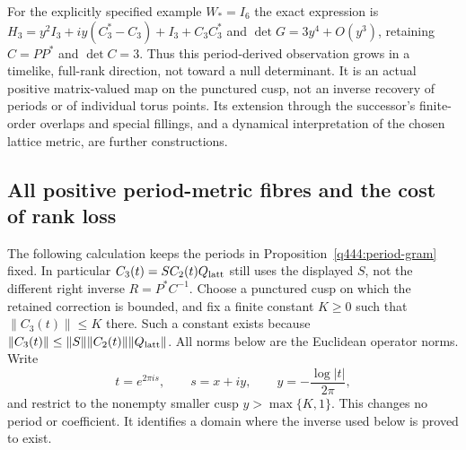 For the explicitly specified example $W_*=I_6$ the exact expression is
$H_3=y^2I_3+iy(C_3^*-C_3)+I_3+C_3C_3^*$ and
$\det G=3y^4+O(y^3)$, retaining $C=PP^*$ and $\det C=3$.
Thus this period-derived observation grows in a timelike, full-rank
direction, not toward a null determinant. It is an actual positive
matrix-valued map on the punctured cusp, not an inverse recovery of
periods or of individual torus points. Its extension through the
successor's finite-order overlaps and special fillings, and a dynamical
interpretation of the chosen lattice metric, are further constructions.


\subsection*{All positive period-metric fibres and the cost of rank loss}

The following calculation keeps the periods in
Proposition~\ref{q444:period-gram} fixed.  In particular
$C_3(t)=SC_2(t)Q_{\rm latt}$ still uses the displayed $S$, not the
different right inverse $R=P^*C^{-1}$.  Choose a punctured cusp on which
the retained correction is bounded, and fix a finite constant $K\geq0$
such that $\|C_3(t)\|\leq K$ there.  Such a constant exists because
$\|C_3(t)\|\leq\|S\|\|C_2(t)\|\|Q_{\rm latt}\|$.
All norms below are the Euclidean operator norms.  Write
\[
 t=e^{2\pi i s},\qquad s=x+iy,\qquad
 y=-\frac{\log|t|}{2\pi},
\]
and restrict to the nonempty smaller cusp $y>\max\{K,1\}$.
This changes no period or coefficient.  It identifies a domain where
the inverse used below is proved to exist.

